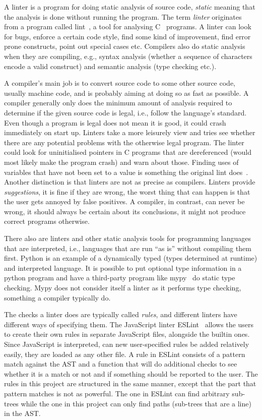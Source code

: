 \documentclass[a4paper,12pt]{article}
\begin{document}
A linter is a program for doing static analysis of source code, \emph{static} meaning that
the analysis is done without running the program. The term \emph{linter} originates from a
program called lint~\cite{lint}, a tool for analysing C~\cite{c1978} programs. A linter can look for
bugs, enforce a certain code style, find some kind of improvement, find error prone
constructs, point out special cases etc. Compilers also do static analysis when they are
compiling, e.g., syntax analysis (whether a sequence of characters encode a valid
construct) and semantic analysis (type checking etc.\@).

A compiler's main job is to convert source code to some other source code, usually machine
code, and is probably aiming at doing so as fast as possible. A compiler generally only
does the minimum amount of analysis required to determine if the given source code is
legal, i.e., follow the language's standard. Even though a program is legal does not mean
it is good, it could crash immediately on start up. Linters take a more leisurely view and
tries see whether there are any potential problems with the otherwise legal program. The
linter could look for uninitialised pointers in C programs that are dereferenced (would
most likely make the program crash) and warn about those. Finding uses of variables that
have not been set to a value is something the original lint does~\cite{lint}. Another
distinction is that linters are not as precise as compilers. Linters provide
\emph{suggestions}, it is fine if they are wrong, the worst thing that can happen is that
the user gets annoyed by false positives. A compiler, in contrast, can never be wrong, it
should always be certain about its conclusions, it might not produce correct programs
otherwise.

There also are linters and other static analysis tools for
programming languages that are
interpreted, i.e., languages that are run ``as is'' without compiling them first. Python
is an example of a dynamically typed (types determined at runtime) and interpreted
language. It is possible to put optional type information in a python program and have a
third-party program like mypy~\cite{mypy} do static type checking. Mypy does not
consider itself a linter as it performs type checking, something a compiler typically
do.

The checks a linter does are typically called \emph{rules}, and different linters have
different ways of specifying them. The JavaScript linter ESLint~\cite{ESLint} allows the users
to create their own rules in separate JavaScript files, alongside the builtin ones.
Since JavaScript is interpreted, can new user-specified rules be added relatively easily,
they are loaded as any other file.
A rule in ESLint
consists of a pattern match against the AST and a function
that will do additional checks to see whether it is a match or not and if something
should be reported to the user. The rules in this project are structured in the same
manner, except that the part that pattern matches is not as powerful. The one in ESLint can
find arbitrary sub-trees while the one in this project can only find paths (sub-trees that
are a line) in the AST.
\end{document}
